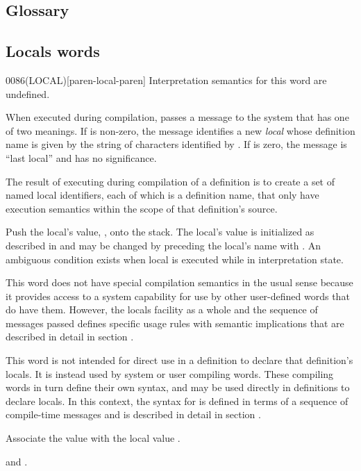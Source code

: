 \begin{intro}
\subsection{Glossary} %
\end{intro}

\subsection{Locals words} %

\begin{worddef}[LOCAL]{0086}{(LOCAL)}[paren-local-paren]
\interpret
	Interpretation semantics for this word are undefined.

\execute

	When executed during compilation,  passes a
	message to the system that has one of two meanings. If 
	is non-zero, the message identifies a new \emph{local} whose
	definition name is given by the string of characters identified
	by . If  is zero, the message is ``last
	local'' and  has no significance.

	The result of executing  during compilation of a
	definition is to create a set of named local identifiers, each
	of which is a definition name, that only have execution
	semantics within the scope of that definition's source.

\execute[local]

	Push the local's value, , onto the stack. The local's
	value is initialized as described in  and may be changed by preceding the local's
	name with . An ambiguous condition exists when local is
	executed while in interpretation state.

\note
	This word does not have special compilation semantics in the
	usual sense because it provides access to a system capability
	for use by other user-defined words that do have them. However,
	the locals facility as a whole and the sequence of messages
	passed defines specific usage rules with semantic implications
	that are described in detail in section
	.

\note
	This word is not intended for direct use in a definition to
	declare that definition's locals. It is instead used by system
	or user compiling words. These compiling words in turn define
	their own syntax, and may be used directly in definitions to
	declare locals. In this context, the syntax for 
	is defined in terms of a sequence of compile-time messages and
	is described in detail in section .


	Associate the value  with the local value
	.

\see {} and
	.
\end{worddef}


